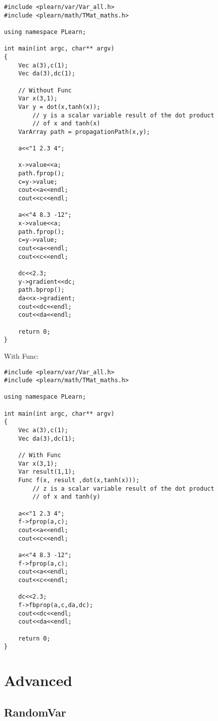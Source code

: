 \documentclass[11pt]{book}
\begin{document}
\begin{verbatim}
#include <plearn/var/Var_all.h>
#include <plearn/math/TMat_maths.h>

using namespace PLearn;

int main(int argc, char** argv)
{
    Vec a(3),c(1);
    Vec da(3),dc(1);

    // Without Func
    Var x(3,1);
    Var y = dot(x,tanh(x));
        // y is a scalar variable result of the dot product
        // of x and tanh(x)
    VarArray path = propagationPath(x,y);

    a<<"1 2.3 4";

    x->value<<a;
    path.fprop();
    c=y->value;
    cout<<a<<endl;
    cout<<c<<endl;

    a<<"4 8.3 -12";
    x->value<<a;
    path.fprop();
    c=y->value;
    cout<<a<<endl;
    cout<<c<<endl;

    dc<<2.3;
    y->gradient<<dc;
    path.bprop();
    da<<x->gradient;
    cout<<dc<<endl;
    cout<<da<<endl;

    return 0;
}
\end{verbatim}

With Func:

\begin{verbatim}
#include <plearn/var/Var_all.h>
#include <plearn/math/TMat_maths.h>

using namespace PLearn;

int main(int argc, char** argv)
{
    Vec a(3),c(1);
    Vec da(3),dc(1);

    // With Func
    Var x(3,1);
    Var result(1,1);
    Func f(x, result ,dot(x,tanh(x)));
        // z is a scalar variable result of the dot product
        // of x and tanh(y)

    a<<"1 2.3 4";
    f->fprop(a,c);
    cout<<a<<endl;
    cout<<c<<endl;

    a<<"4 8.3 -12";
    f->fprop(a,c);
    cout<<a<<endl;
    cout<<c<<endl;

    dc<<2.3;
    f->fbprop(a,c,da,dc);
    cout<<dc<<endl;
    cout<<da<<endl;

    return 0;
}
\end{verbatim}


\chapter{Advanced}

\section{RandomVar}
\end{document}

